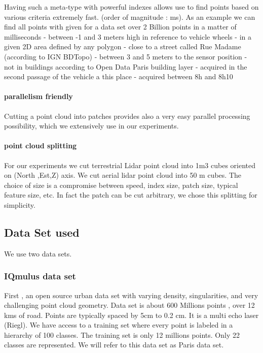 				Having such a meta-type with powerful indexes allows use to find points based on various criteria extremely fast. (order of magnitude : ms). 
				As an example we can find all points with given for a data set over 2 Billion points in a matter of milliseconds 
				 - between -1 and 3 meters high in reference to vehicle wheels
				 - in a given 2D area defined by any polygon
				 - close to a street called Rue Madame (according to IGN BDTopo)
				 - between 3 and 5 meters to the sensor position 
				 - not in buildings according to Open Data Paris building layer 
				 - acquired in the second passage of the vehicle a this place
				 - acquired between 8h and 8h10
		 
		    \paragraph{parallelism friendly}
				Cutting a point cloud into patches provides also a very easy parallel processing possibility, which we extensively use in our experiments.
		
			\paragraph{point cloud splitting}
				For our experiments we cut terrestrial Lidar point cloud into 1m3 cubes oriented on (North ,Est,Z) axis.
				We cut aerial lidar point cloud into 50 m cubes.
				The choice of size is a compromise between speed, index size, patch size, typical feature size, etc.
				In fact the patch can be cut arbitrary, we chose this splitting for simplicity.
		
	\subsection{Data Set used}
		We use two data sets.
		\subsubsection{IQmulus data set}
			First , an open source urban data set with varying density, singularities, and very challenging point cloud geometry.
			Data set is about 600 Millions points , over 12 kms of road. Points are typically spaced by 5cm to 0.2 cm. It is a multi echo laser (Riegl).
			We have access to a training set where every point is labeled in a hierarchy of 100 classes. The training set is only 12 millions points. Only 22 classes are represented.
			We will refer to this data set as Paris data set.
			
